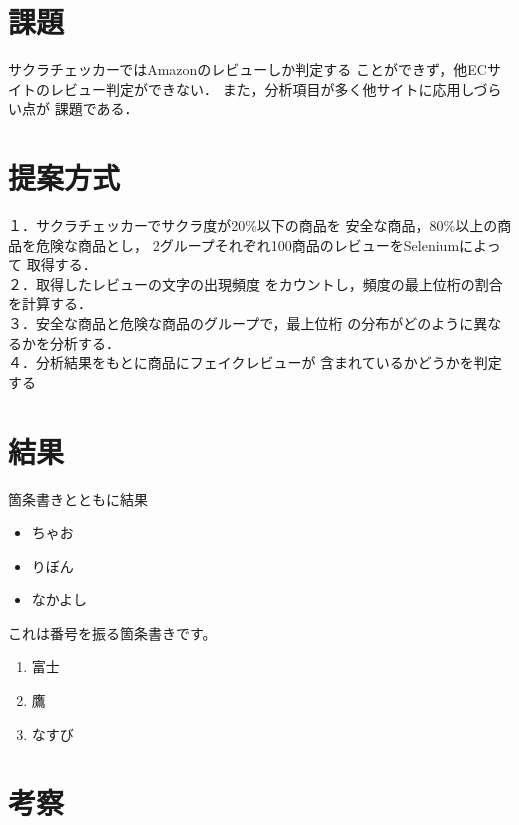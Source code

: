 \documentclass[a4paper, twocolumn]{jsarticle}
\begin{document}
\section{課題}
サクラチェッカーではAmazonのレビューしか判定する
ことができず，他ECサイトのレビュー判定ができない．
また，分析項目が多く他サイトに応用しづらい点が
課題である．

\section{提案方式}
１．サクラチェッカーでサクラ度が20\%以下の商品を
安全な商品，80\%以上の商品を危険な商品とし，
2グループそれぞれ100商品のレビューをSeleniumによって
取得する．
\\２．取得したレビューの文字の出現頻度
をカウントし，頻度の最上位桁の割合を計算する．
\\３．安全な商品と危険な商品のグループで，最上位桁
の分布がどのように異なるかを分析する．
\\４．分析結果をもとに商品にフェイクレビューが
含まれているかどうかを判定する

\section{結果}
箇条書きとともに結果


\begin{itemize}
  \item ちゃお
  \item りぼん
  \item なかよし
\end{itemize}

これは番号を振る箇条書きです。

\begin{enumerate}
  \item 富士
  \item 鷹
  \item なすび
\end{enumerate}

\section{考察}
\end{document}

